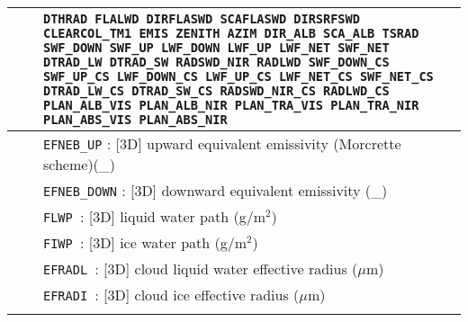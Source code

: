 \begin{center}
\begin{tabular}{|>{\centering}p{3cm}|>{\centering}p{2.5cm}|p{11cm}|}
\hline
\multirow{36}{*}{NRAD\_3D}\index{NRAD\_3D!\innam{NAM\_DIAG}}&\multirow{20}{*}{4} &{\tt DTHRAD FLALWD DIRFLASWD SCAFLASWD DIRSRFSWD CLEARCOL\_TM1 EMIS ZENITH AZIM DIR\_ALB SCA\_ALB TSRAD SWF\_DOWN SWF\_UP LWF\_DOWN LWF\_UP LWF\_NET SWF\_NET DTRAD\_LW DTRAD\_SW RADSWD\_NIR RADLWD SWF\_DOWN\_CS SWF\_UP\_CS LWF\_DOWN\_CS LWF\_UP\_CS LWF\_NET\_CS SWF\_NET\_CS DTRAD\_LW\_CS DTRAD\_SW\_CS RADSWD\_NIR\_CS RADLWD\_CS  PLAN\_ALB\_VIS  PLAN\_ALB\_NIR PLAN\_TRA\_VIS PLAN\_TRA\_NIR PLAN\_ABS\_VIS PLAN\_ABS\_NIR}  \\\cline{3-3}
& & {\tt EFNEB\_UP} : [3D] upward equivalent emissivity (Morcrette scheme)(\_) \\\cline{3-3}

& & {\tt EFNEB\_DOWN} : [3D] downward equivalent emissivity (\_) \\\cline{3-3}
& &{\tt FLWP }: [3D] liquid water path (g/m$^2$) \\\cline{3-3}
& &{\tt FIWP }: [3D] ice water path (g/m$^2$) \\\cline{3-3}
& &{\tt EFRADL }: [3D] cloud liquid water effective radius ($\mu$m) \\\cline{3-3}
& &{\tt EFRADI }: [3D] cloud ice effective radius ($\mu$m) \\\cline{3-3}


\end{tabular}
\end{center}
